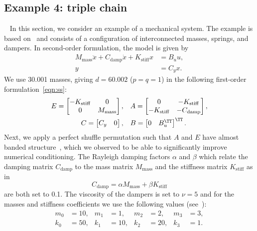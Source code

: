\subsection{Example 4: triple chain}~\label{sct:triplechain}
In this section, we consider an example of a mechanical system.
The example is based on~\cite[Example~2]{truhar2009efficient} and consists of a configuration of interconnected masses, springs, and dampers.
In second-order formulation, the model is given by
\begin{equation}
\begin{aligned}
	M_\mathrm{mass} \ddot{x} + C_\mathrm{damp} \dot{x} + K_\mathrm{stiff} x & = B_u u, \\
		y & = C_y x.
\end{aligned}
\label{eqn:ss_secondorder}
\end{equation}
We use \num{30,001} masses, giving $d = \num{60,002}$ ($p = q = 1$) in the following first-order formulation~\eqref{eqn:ss}:
\begin{align*}
	E = \begin{bmatrix} -K_\mathrm{stiff} & 0 \\ 0 & M_\mathrm{mass} \end{bmatrix}, \quad & A = \begin{bmatrix} 0 & -K_\mathrm{stiff} \\ -K_\mathrm{stiff} & -C_\mathrm{damp} \end{bmatrix}, \\
	C = \begin{bmatrix} C_y & 0 \end{bmatrix}, \quad & B = \begin{bmatrix} 0 & B_u^\TT \end{bmatrix}^\TT.
\end{align*}
Next, we apply a perfect shuffle permutation such that $A$ and $E$ have almost banded structure~\cite{kressner2019lowrank}, which we observed to be able to significantly improve numerical conditioning.
The Rayleigh damping factors $\alpha$ and $\beta$ which relate the damping matrix $C_\mathrm{damp}$ to the mass matrix $M_\mathrm{mass}$ and the stiffness matrix $K_\mathrm{stiff}$ as in
\begin{equation}
	C_\mathrm{damp} = \alpha M_\mathrm{mass} + \beta K_\mathrm{stiff}
\end{equation}
are both set to 0.1.
The viscosity of the dampers is set to $\nu = 5$ and for the masses and stiffness coefficients we use the following values (see~\cite[Figure~5.1]{truhar2009efficient}):
\begin{equation}
\begin{aligned}
	m_0 & = 10, & m_1 & = 1, & m_2  & = 2, & m_3  & = 3, \\
	k_0 & = 50, & k_1 & = 10, & k_2 & = 20, & k_3 & = 1.
\end{aligned}
\end{equation}

